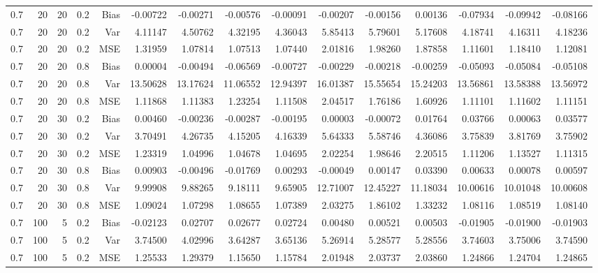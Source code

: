\begin{table}[!htbp]
\begin{tabular}{lrrrrrrrrrrrrrr}
0.7 &  20 & 20 & 0.2 & Bias & -0.00722 & -0.00271 & -0.00576 & -0.00091 & -0.00207 & -0.00156 & 0.00136 & -0.07934 & -0.09942 & -0.08166 \\
0.7 &  20 & 20 & 0.2 & Var & 4.11147 & 4.50762 & 4.32195 & 4.36043 & 5.85413 & 5.79601 & 5.17608 & 4.18741 & 4.16311 & 4.18236 \\
0.7 &  20 & 20 & 0.2 & MSE & 1.31959 & 1.07814 & 1.07513 & 1.07440 & 2.01816 & 1.98260 & 1.87858 & 1.11601 & 1.18410 & 1.12081 \\
0.7 &  20 & 20 & 0.8 & Bias & 0.00004 & -0.00494 & -0.06569 & -0.00727 & -0.00229 & -0.00218 & -0.00259 & -0.05093 & -0.05084 & -0.05108 \\
0.7 &  20 & 20 & 0.8 & Var & 13.50628 & 13.17624 & 11.06552 & 12.94397 & 16.01387 & 15.55654 & 15.24203 & 13.56861 & 13.58388 & 13.56972 \\
0.7 &  20 & 20 & 0.8 & MSE & 1.11868 & 1.11383 & 1.23254 & 1.11508 & 2.04517 & 1.76186 & 1.60926 & 1.11101 & 1.11602 & 1.11151 \\
0.7 &  20 & 30 & 0.2 & Bias & 0.00460 & -0.00236 & -0.00287 & -0.00195 & 0.00003 & -0.00072 & 0.01764 & 0.03766 & 0.00063 & 0.03577 \\
0.7 &  20 & 30 & 0.2 & Var & 3.70491 & 4.26735 & 4.15205 & 4.16339 & 5.64333 & 5.58746 & 4.36086 & 3.75839 & 3.81769 & 3.75902 \\
0.7 &  20 & 30 & 0.2 & MSE & 1.23319 & 1.04996 & 1.04678 & 1.04695 & 2.02254 & 1.98646 & 2.20515 & 1.11206 & 1.13527 & 1.11315 \\
0.7 &  20 & 30 & 0.8 & Bias & 0.00903 & -0.00496 & -0.01769 & 0.00293 & -0.00049 & 0.00147 & 0.03390 & 0.00633 & 0.00078 & 0.00597 \\
0.7 &  20 & 30 & 0.8 & Var & 9.99908 & 9.88265 & 9.18111 & 9.65905 & 12.71007 & 12.45227 & 11.18034 & 10.00616 & 10.01048 & 10.00608 \\
0.7 &  20 & 30 & 0.8 & MSE & 1.09024 & 1.07298 & 1.08655 & 1.07389 & 2.03275 & 1.86102 & 1.33232 & 1.08116 & 1.08519 & 1.08140 \\
0.7 & 100 &  5 & 0.2 & Bias & -0.02123 & 0.02707 & 0.02677 & 0.02724 & 0.00480 & 0.00521 & 0.00503 & -0.01905 & -0.01900 & -0.01903 \\
0.7 & 100 &  5 & 0.2 & Var & 3.74500 & 4.02996 & 3.64287 & 3.65136 & 5.26914 & 5.28577 & 5.28556 & 3.74603 & 3.75006 & 3.74590 \\
0.7 & 100 &  5 & 0.2 & MSE & 1.25533 & 1.29379 & 1.15650 & 1.15784 & 2.01948 & 2.03737 & 2.03860 & 1.24866 & 1.24704 & 1.24865 \\

\end{tabular}
\end{table}
